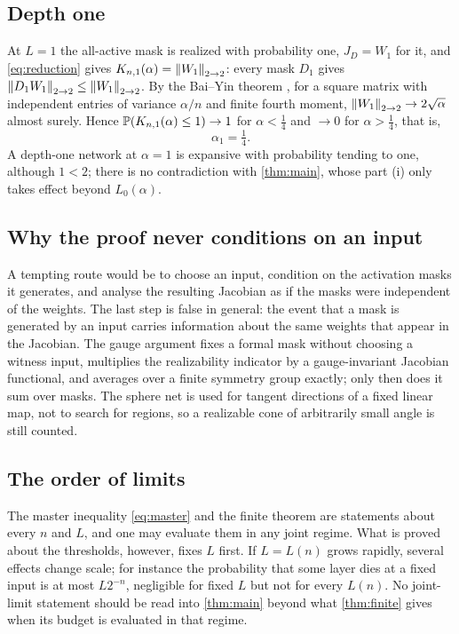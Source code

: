 \subsection{Depth one}

At $L=1$ the all-active mask is realized with probability one, $J_D=W_1$ for it, and \cref{eq:reduction} gives $K_{n,1}(\alpha)=\left\lVert W_1\right\rVert_{2\to 2}$: every mask $D_1$ gives $\left\lVert D_1W_1\right\rVert_{2\to 2}\le\left\lVert W_1\right\rVert_{2\to 2}$. By the Bai--Yin theorem \cite{baiyin}, for a square matrix with independent entries of variance $\alpha/n$ and finite fourth moment, $\left\lVert W_1\right\rVert_{2\to 2}\to2\sqrt\alpha$ almost surely. Hence $\mathbb{P}(K_{n,1}(\alpha)\le1)\to1$ for $\alpha<\tfrac14$ and $\to0$ for $\alpha>\tfrac14$, that is,
\[
\alpha_1=\tfrac14 .
\]
A depth-one network at $\alpha=1$ is expansive with probability tending to one, although $1<2$; there is no contradiction with \cref{thm:main}, whose part (i) only takes effect beyond $L_0(\alpha)$.

\subsection{Why the proof never conditions on an input}

A tempting route would be to choose an input, condition on the activation masks it generates, and analyse the resulting Jacobian as if the masks were independent of the weights. The last step is false in general: the event that a mask is generated by an input carries information about the same weights that appear in the Jacobian. The gauge argument fixes a formal mask without choosing a witness input, multiplies the realizability indicator by a gauge-invariant Jacobian functional, and averages over a finite symmetry group exactly; only then does it sum over masks. The sphere net is used for tangent directions of a fixed linear map, not to search for regions, so a realizable cone of arbitrarily small angle is still counted.

\subsection{The order of limits}

The master inequality \cref{eq:master} and the finite theorem are statements about every $n$ and $L$, and one may evaluate them in any joint regime. What is proved about the thresholds, however, fixes $L$ first. If $L=L(n)$ grows rapidly, several effects change scale; for instance the probability that some layer dies at a fixed input is at most $L2^{-n}$, negligible for fixed $L$ but not for every $L(n)$. No joint-limit statement should be read into \cref{thm:main} beyond what \cref{thm:finite} gives when its budget is evaluated in that regime.

